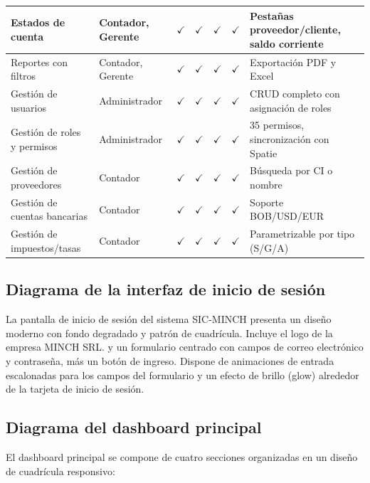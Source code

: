 \documentclass[stu]{apa7}
\begin{document}
\begin{longtable}{|L{3.5cm}|L{2.5cm}|C{1.5cm}|C{1.5cm}|C{1.5cm}|C{1.5cm}|L{3cm}|}
Estados de cuenta & Contador, Gerente & $\checkmark$ & $\checkmark$ & $\checkmark$ & $\checkmark$ & Pestañas proveedor/cliente, saldo corriente \\
\hline
Reportes con filtros & Contador, Gerente & $\checkmark$ & $\checkmark$ & $\checkmark$ & $\checkmark$ & Exportación PDF y Excel \\
\hline
Gestión de usuarios & Administrador & $\checkmark$ & $\checkmark$ & $\checkmark$ & $\checkmark$ & CRUD completo con asignación de roles \\
\hline
Gestión de roles y permisos & Administrador & $\checkmark$ & $\checkmark$ & $\checkmark$ & $\checkmark$ & 35 permisos, sincronización con Spatie \\
\hline
Gestión de proveedores & Contador & $\checkmark$ & $\checkmark$ & $\checkmark$ & $\checkmark$ & Búsqueda por CI o nombre \\
\hline
Gestión de cuentas bancarias & Contador & $\checkmark$ & $\checkmark$ & $\checkmark$ & $\checkmark$ & Soporte BOB/USD/EUR \\
\hline
Gestión de impuestos/tasas & Contador & $\checkmark$ & $\checkmark$ & $\checkmark$ & $\checkmark$ & Parametrizable por tipo (S/G/A) \\
\hline
\end{longtable}

\newpage

\subsection{Diagrama de la interfaz de inicio de sesión}

La pantalla de inicio de sesión del sistema SIC-MINCH presenta un diseño moderno con fondo degradado y patrón de cuadrícula. Incluye el logo de la empresa MINCH SRL. y un formulario centrado con campos de correo electrónico y contraseña, más un botón de ingreso. Dispone de animaciones de entrada escalonadas para los campos del formulario y un efecto de brillo (glow) alrededor de la tarjeta de inicio de sesión.

\subsection{Diagrama del dashboard principal}

El dashboard principal se compone de cuatro secciones organizadas en un diseño de cuadrícula responsivo:
\end{document}
